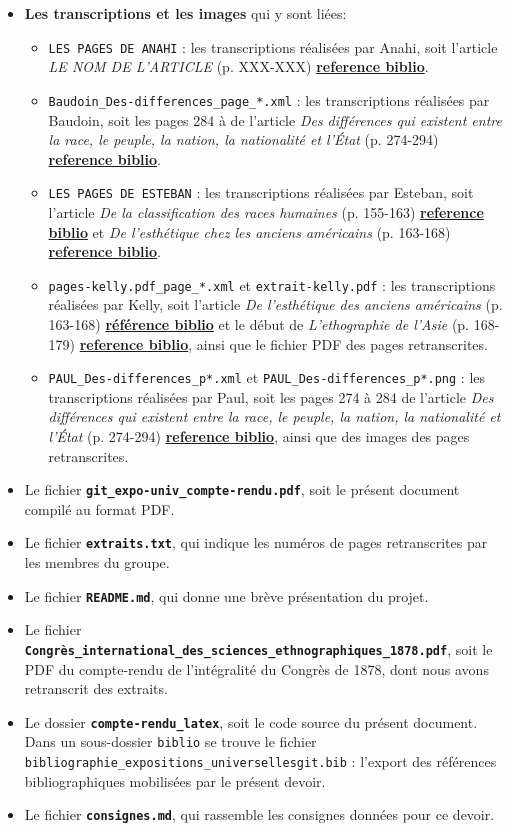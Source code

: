 \documentclass{article}
\begin{document}
	\begin{itemize}
		\item \textbf{Les transcriptions et les images} qui y sont liées:
		\begin{itemize}
			\item \texttt{LES PAGES DE ANAHI} : les transcriptions réalisées par Anahi, soit l'article \textit{LE NOM DE L'ARTICLE} (p. XXX-XXX) \underline{\textbf{reference biblio}}.
			\item \texttt{Baudoin\_Des-differences\_page\_*.xml} : les transcriptions réalisées par Baudoin, soit les pages 284 à de l'article \textit{Des différences qui existent entre la race, le peuple, la nation, la nationalité et l'État} (p. 274-294) \underline{\textbf{reference biblio}}.
			\item \texttt{LES PAGES DE ESTEBAN} : les transcriptions réalisées par Esteban, soit l'article \textit{De la classification des races humaines} (p. 155-163) \underline{\textbf{reference biblio}} et \textit{De l’esthétique chez les anciens américains} (p. 163-168) \underline{\textbf{reference biblio}}.
			\item \texttt{pages-kelly.pdf\_page\_*.xml} et \texttt{extrait-kelly.pdf} : les transcriptions réalisées par Kelly, soit l'article \textit{De l'esthétique des anciens américains} (p. 163-168) \underline{\textbf{référence biblio}} et le début de \textit{L'ethographie de l'Asie} (p. 168-179) \underline{\textbf{reference biblio}}, ainsi que le fichier PDF des pages retranscrites.
			\item \texttt{PAUL\_Des-differences\_p*.xml} et \texttt{PAUL\_Des-differences\_p*.png} : les transcriptions réalisées par Paul, soit les pages 274 à 284 de l'article \textit{Des différences qui existent entre la race, le peuple, la nation, la nationalité et l'État} (p. 274-294) \underline{\textbf{reference biblio}}, ainsi que des images des pages retranscrites.
		\end{itemize}
		\item Le fichier \textbf{\texttt{git\_expo-univ\_compte-rendu.pdf}}, soit le présent document compilé au format PDF.
		\item Le fichier \textbf{\texttt{extraits.txt}}, qui indique les numéros de pages retranscrites par les membres du groupe.
		\item Le fichier \textbf{\texttt{README.md}}, qui donne une brève présentation du projet.
		\item Le fichier \textbf{\texttt{Congrès\_international\_des\_sciences\_ethnographiques\_1878.pdf}}, soit le PDF du compte-rendu de l'intégralité du Congrès de 1878, dont nous avons retranscrit des extraits.
		\item Le dossier \textbf{\texttt{compte-rendu\_latex}}, soit le code source du présent document. Dans un sous-dossier \texttt{biblio} se trouve le fichier \texttt{bibliographie\_expositions\_universellesgit.bib} : l'export des références bibliographiques mobilisées par le présent devoir.
		\item Le fichier \textbf{\texttt{consignes.md}}, qui rassemble les consignes données pour ce devoir.
	\end{itemize}
	
\end{document}
